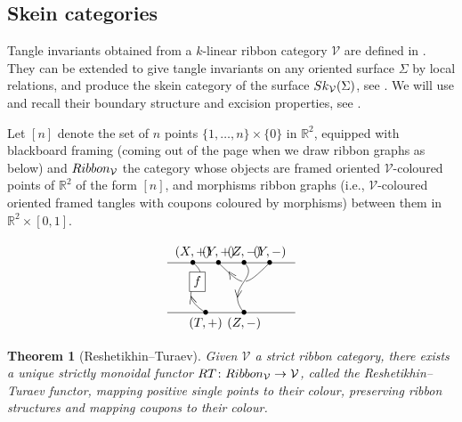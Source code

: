 \documentclass[11pt]{article}
\numberwithin{equation}{section}
\numberwithin{equation}{section}
\newtheorem{Theorem}{Theorem}[section]
\begin{document}
\subsection{Skein categories}\label{SectSkCat}
Tangle invariants obtained from a $k$-linear ribbon category $\mathcal{V}$ are defined in \cite[Section~I.2]{Turaev}. They can be extended to give tangle invariants on any oriented surface $\Sigma$ by local relations, and produce the skein category of the surface ${\rm Sk}_\mathcal{V}(\Sigma)$, see \cite{Walker}. We will use and recall their boundary structure and excision properties, see \cite{Cooke}.

\begin{Definition}
Let $[n]$ denote the set of $n$ points $\{1,\ldots,n\} \times \{0\}$ in $\mathbb{R}^2$, equipped with blackboard framing (coming out of the page when we draw ribbon graphs as below) and ${\rm Ribbon}_\mathcal{V}$ the category whose objects are framed oriented $\mathcal{V}$-coloured points of $\mathbb{R}^2$ of the form $[n]$, and morphisms ribbon graphs (i.e., $\mathcal{V}$-coloured oriented framed tangles with coupons coloured by morphisms) between them in $\mathbb{R}^2\times[0,1]$.
\end{Definition}
$$
\begin{tikzpicture}[baseline = 15pt, yscale = 0.7, xscale = 1.2]
\draw (0,2) -- (3,2) node[pos = 0.2]{\small $\bullet$} node[pos = 0.2, above]{\tiny $(X,+)$} node[pos = 0.4]{\small $\bullet$} node[pos = 0.4, above]{\tiny $(Y,+)$} node[pos = 0.6]{\small $\bullet$} node[pos = 0.6, above]{\tiny $(Z,-)$} node[pos = 0.8]{\small $\bullet$} node[pos = 0.8, above]{\tiny $(Y,-)$};
\draw (0,0) -- (3,0) node[pos = 0.3]{\small $\bullet$} node[pos = 0.3, below]{\tiny $(T,+)$} node[pos = 0.6]{\small $\bullet$} node[pos = 0.6, below]{\tiny $(Z,-)$};
\draw (0.9,0) .. controls (0,1) and (1.2,1.2) .. (0.6,2) node[pos=0.2, sloped]{$<$} node [pos = 0.6, rectangle, draw, fill=white]{$f$};
\draw (1.2,2) .. controls (1.8,1) .. (2.4,2) node[fill, color= white, midway, circle, scale = 0.3]{} node[pos = 0.2, sloped]{$<$};
\draw (1.8,0) .. controls (1.3,1) and (2.2,1.4) .. (1.8,2) node[pos = 0.3, sloped]{$<$};
\end{tikzpicture}
$$

\begin{Theorem}[Reshetikhin--Turaev]\label{thmturaev} Given $\mathcal{V}$ a strict ribbon category, there exists a unique strictly monoidal functor ${\rm RT}\colon {\rm Ribbon}_\mathcal{V} \to \mathcal{V}$, called the Reshetikhin--Turaev functor, mapping positive single points to their colour, preserving ribbon structures and mapping coupons to their colour.
\end{Theorem}
\end{document}
